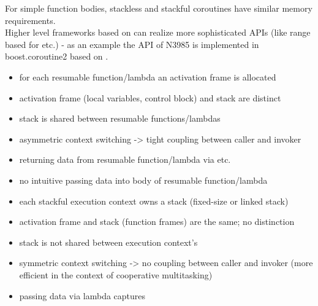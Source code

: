 \newline
For simple function bodies, stackless and stackful coroutines have similar
memory requirements.\\
Higher level frameworks based on \ectx can realize more sophisticated APIs
(like range based for etc.) - as an example the API of N3985\cite{N3985} is
implemented in boost.coroutine2\cite{bcoroutine2} based on
.

\begin{itemize}
    \item   for each resumable function/lambda an activation frame is allocated
    \item   activation frame (local variables, control block) and stack are
            distinct
    \item   stack is shared between resumable functions/lambdas
    \item   asymmetric context switching -> tight coupling between caller and
            invoker
    \item   returning data from resumable function/lambda via \yield etc.
    \item   no intuitive passing data into body of resumable function/lambda
\end{itemize}

\begin{itemize}
    \item   each stackful execution context owns a stack (fixed-size or linked
            stack)
    \item   activation frame and stack (function frames) are the same; no
            distinction
    \item   stack is not shared between execution context's
    \item   symmetric context switching -> no coupling between caller and
            invoker (more efficient in the context of cooperative multitasking)
    \item   passing data via lambda captures
\end{itemize}
